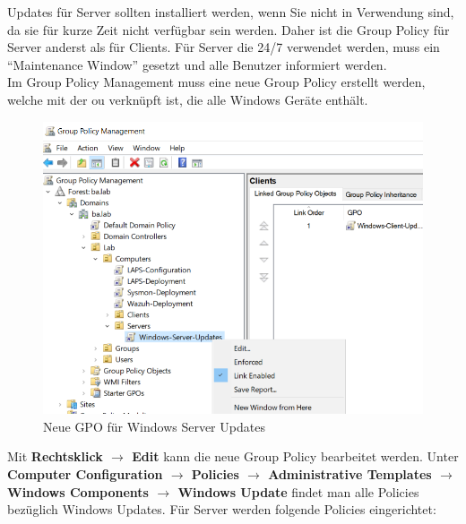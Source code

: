 Updates für Server sollten installiert werden, wenn Sie nicht in Verwendung sind, da sie für kurze Zeit nicht verfügbar sein werden.
Daher ist die Group Policy für Server anderst als für Clients.
Für Server die 24/7 verwendet werden, muss ein ``Maintenance Window'' gesetzt und alle Benutzer informiert werden.\\

Im Group Policy Management muss eine neue Group Policy erstellt werden, welche mit der \acrshort{ou} verknüpft ist, die alle Windows Geräte enthält.
\begin{figure}[H]
    \centering
    \includegraphics[width=0.7\linewidth]{../img/Updates/edit-gpo-server.png}
    \caption{Neue GPO für Windows Server Updates}
\end{figure}

Mit \textbf{Rechtsklick $\rightarrow$ Edit} kann die neue Group Policy bearbeitet werden.
Unter \textbf{Computer Configuration $\rightarrow$ Policies $\rightarrow$ Administrative Templates $\rightarrow$ Windows Components $\rightarrow$ Windows Update} findet man alle Policies bezüglich Windows Updates.
Für Server werden folgende Policies eingerichtet:

